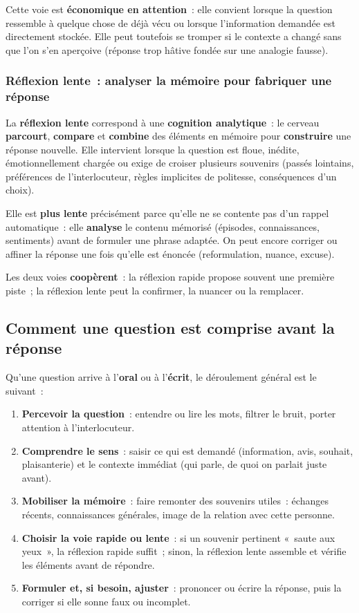\documentclass[a4paper,12pt]{report}
\begin{document}
	Cette voie est \textbf{économique en attention}~: elle convient lorsque la question
	ressemble à quelque chose de déjà vécu ou lorsque l'information demandée est
	directement stockée. Elle peut toutefois se tromper si le contexte a changé sans que
	l'on s'en aperçoive (réponse trop hâtive fondée sur une analogie fausse).
	
	\subsubsection{Réflexion lente~: analyser la mémoire pour fabriquer une réponse}
	
	La \textbf{réflexion lente} correspond à une \textbf{cognition analytique}~: le cerveau
	\textbf{parcourt}, \textbf{compare} et \textbf{combine} des éléments en mémoire pour
	\textbf{construire} une réponse nouvelle. Elle intervient lorsque la question est
	floue, inédite, émotionnellement chargée ou exige de croiser plusieurs souvenirs
	(passés lointains, préférences de l'interlocuteur, règles implicites de politesse,
	conséquences d'un choix).
	
	Elle est \textbf{plus lente} précisément parce qu'elle ne se contente pas d'un rappel
	automatique~: elle \textbf{analyse} le contenu mémorisé (épisodes, connaissances,
	sentiments) avant de formuler une phrase adaptée. On peut encore corriger ou affiner
	la réponse une fois qu'elle est énoncée (reformulation, nuance, excuse).
	
	Les deux voies \textbf{coopèrent}~: la réflexion rapide propose souvent une première
	piste~; la réflexion lente peut la confirmer, la nuancer ou la remplacer.
	
	\subsection{Comment une question est comprise avant la réponse}
	
	Qu'une question arrive à l'\textbf{oral} ou à l'\textbf{écrit}, le déroulement
	général est le suivant~:
	\begin{enumerate}[leftmargin=*, itemsep=0.25em]
		\item \textbf{Percevoir la question}~: entendre ou lire les mots, filtrer le bruit,
		porter attention à l'interlocuteur.
		\item \textbf{Comprendre le sens}~: saisir ce qui est demandé (information, avis,
		souhait, plaisanterie) et le contexte immédiat (qui parle, de quoi on parlait
		juste avant).
		\item \textbf{Mobiliser la mémoire}~: faire remonter des souvenirs utiles~:
		échanges récents, connaissances générales, image de la relation avec cette personne.
		\item \textbf{Choisir la voie rapide ou lente}~: si un souvenir pertinent «~saute aux
		yeux~», la réflexion rapide suffit~; sinon, la réflexion lente assemble et vérifie
		les éléments avant de répondre.
		\item \textbf{Formuler et, si besoin, ajuster}~: prononcer ou écrire la réponse, puis
		la corriger si elle sonne faux ou incomplet.
	\end{enumerate}
	
\end{document}
